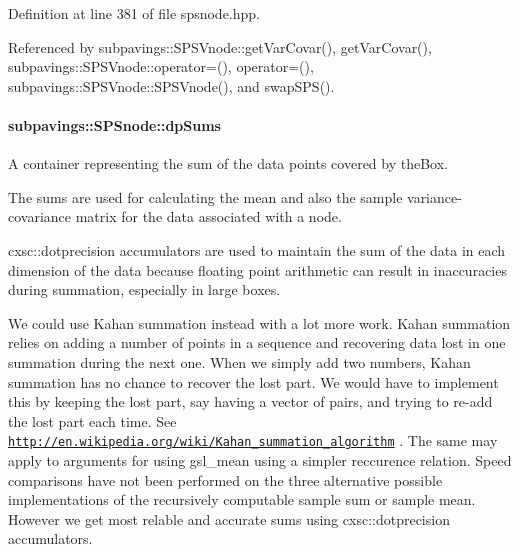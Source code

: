 \-Definition at line 381 of file spsnode.\-hpp.



\-Referenced by subpavings\-::\-S\-P\-S\-Vnode\-::get\-Var\-Covar(), get\-Var\-Covar(), subpavings\-::\-S\-P\-S\-Vnode\-::operator=(), operator=(), subpavings\-::\-S\-P\-S\-Vnode\-::\-S\-P\-S\-Vnode(), and swap\-S\-P\-S().

\hypertarget{classsubpavings_1_1SPSnode_a1e5698e870376a507cd4a09bddc01643}{
\paragraph[{dp\-Sums}]{ {\bf subpavings\-::\-S\-P\-Snode\-::dp\-Sums}}}\label{classsubpavings_1_1SPSnode_a1e5698e870376a507cd4a09bddc01643}


\-A container representing the sum of the data points covered by the\-Box. 

\-The sums are used for calculating the mean and also the sample variance-\/covariance matrix for the data associated with a node.

cxsc\-::dotprecision accumulators are used to maintain the sum of the data in each dimension of the data because floating point arithmetic can result in inaccuracies during summation, especially in large boxes.

\-We could use \-Kahan summation instead with a lot more work. \-Kahan summation relies on adding a number of points in a sequence and recovering data lost in one summation during the next one. \-When we simply add two numbers, \-Kahan summation has no chance to recover the lost part. \-We would have to implement this by keeping the lost part, say having a vector of pairs, and trying to re-\/add the lost part each time. \-See \href{http://en.wikipedia.org/wiki/Kahan_summation_algorithm}{\tt http\-://en.\-wikipedia.\-org/wiki/\-Kahan\-\_\-summation\-\_\-algorithm} . \-The same may apply to arguments for using gsl\-\_\-mean using a simpler reccurence relation. \-Speed comparisons have not been performed on the three alternative possible implementations of the recursively computable sample sum or sample mean. \-However we get most relable and accurate sums using cxsc\-::dotprecision accumulators. 

